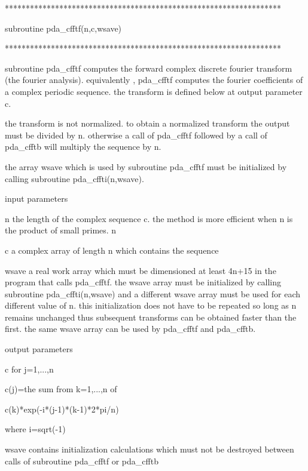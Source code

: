 \documentclass[11pt,twoside,nolof]{starlink}
\begin{document}
\begin{terminalv}
******************************************************************

subroutine pda_cfftf(n,c,wsave)

******************************************************************

subroutine pda_cfftf computes the forward complex discrete fourier
transform (the fourier analysis). equivalently , pda_cfftf computes
the fourier coefficients of a complex periodic sequence.
the transform is defined below at output parameter c.

the transform is not normalized. to obtain a normalized transform
the output must be divided by n. otherwise a call of pda_cfftf
followed by a call of pda_cfftb will multiply the sequence by n.

the array wsave which is used by subroutine pda_cfftf must be
initialized by calling subroutine pda_cffti(n,wsave).

input parameters


n      the length of the complex sequence c. the method is
       more efficient when n is the product of small primes. n

c      a complex array of length n which contains the sequence

wsave   a real work array which must be dimensioned at least 4n+15
        in the program that calls pda_cfftf. the wsave array must be
        initialized by calling subroutine pda_cffti(n,wsave) and a
        different wsave array must be used for each different
        value of n. this initialization does not have to be
        repeated so long as n remains unchanged thus subsequent
        transforms can be obtained faster than the first.
        the same wsave array can be used by pda_cfftf and pda_cfftb.

output parameters

c      for j=1,...,n

           c(j)=the sum from k=1,...,n of

                 c(k)*exp(-i*(j-1)*(k-1)*2*pi/n)

                       where i=sqrt(-1)

wsave   contains initialization calculations which must not be
        destroyed between calls of subroutine pda_cfftf or pda_cfftb
\end{terminalv}

\end{document}

